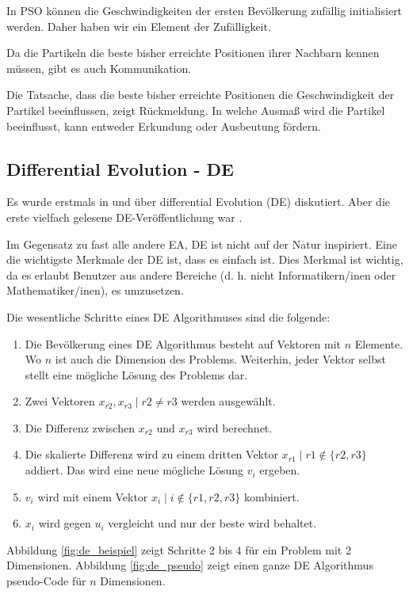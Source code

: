 \documentclass[twoside,twocolumn]{article}
\begin{document}
In PSO können die Geschwindigkeiten der ersten Bevölkerung zufällig initialisiert werden. Daher haben wir ein Element der Zufälligkeit.\par
Da die Partikeln die beste bisher erreichte Positionen ihrer Nachbarn kennen müssen, gibt es auch Kommunikation.\par
Die Tatsache, dass die beste bisher erreichte Positionen die Geschwindigkeit der Partikel beeinflussen, zeigt Rückmeldung. In welche Ausmaß wird die Partikel beeinflusst, kann entweder Erkundung oder Ausbeutung fördern.

\subsection{Differential Evolution - DE}
Es wurde erstmals in \cite{storn_de_a} und \cite{storn_de_b} über differential Evolution (DE) diskutiert. Aber die erste vielfach gelesene DE-Veröffentlichung war \cite{price_storn_de}.\par
Im Gegensatz zu fast alle andere EA, DE ist nicht auf der Natur inspiriert. Eine die wichtigste Merkmale der DE ist, dass es einfach ist. Dies Merkmal ist wichtig, da es erlaubt Benutzer aus andere Bereiche (d. h. nicht Informatikern/inen oder Mathematiker/inen), es umzusetzen.\par
Die wesentliche Schritte eines DE Algorithmuses sind die folgende:

\begin{enumerate}
\item Die Bevölkerung eines DE Algorithmus besteht auf Vektoren mit $n$ Elemente. Wo $n$ ist auch die Dimension des Problems. Weiterhin, jeder Vektor selbst stellt eine mögliche Lösung des Problems dar.
\item Zwei Vektoren $x_{r2}, x_{r3} \mid r2 \neq r3$ werden ausgewählt.
\item Die Differenz zwischen $x_{r2}$ und $x_{r3}$ wird berechnet.
\item Die skalierte Differenz wird zu einem dritten Vektor $x_{r1} \mid r1 \notin \{ r2, r3 \}$ addiert. Das wird eine neue mögliche Lösung $v_i$ ergeben.
\item $v_i$ wird mit einem Vektor $x_i \mid i \notin \{ r1, r2, r3 \}$ kombiniert.
\item $x_i$ wird gegen $u_i$ vergleicht und nur der beste wird behaltet.
\end{enumerate}

Abbildung \ref{fig:de_beispiel} zeigt Schritte 2 bis 4 für ein Problem mit 2 Dimensionen. Abbildung \ref{fig:de_pseudo} zeigt einen ganze DE Algorithmus pseudo-Code für $n$ Dimensionen.\par
\end{document}
